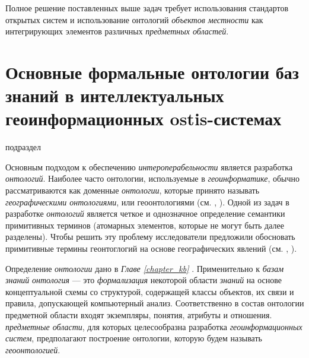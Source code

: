 Полное решение поставленных выше задач требует использования стандартов открытых систем и использование онтологий \textit{объектов местности} как интегрирующих элементов различных \textit{предметных областей}.

\newpage

\section{Основные формальные онтологии баз знаний в интеллектуальных геоинформационных ostis-системах}
\label{chapter_gis_sec_components}

\begin{SCn}	
\begin{scnrelfromlist}{подраздел}
\end{scnrelfromlist}
\end{SCn}

Основным подходом к обеспечению \textit{интероперабельности} является разработка \textit{онтологий}. Наиболее часто онтологии, используемые в \textit{геоинформатике}, обычно рассматриваются как доменные \textit{онтологии}, которые принято называть \textit{географическими онтологиями}, или геоонтологиями (см. , ). Одной из задач в разработке \textit{онтологий} является четкое и однозначное определение семантики примитивных терминов (атомарных элементов, которые не могут быть далее разделены). Чтобы решить эту проблему исследователи предложили обосновать примитивные термины геонтоглогий на основе географических явлений (см. , ).

Определение \textit{онтологии} дано в \textit{Главе \ref{chapter_kb} }. Применительно к \textit{базам знаний} \textit{онтология} --- это \textit{формализация} некоторой области \textit{знаний} на основе концептуальной схемы со структурой, содержащей классы объектов, их связи и правила, допускающей компьютерный анализ. Соответственно в состав онтологии предметной области входят экземпляры, понятия, атрибуты и отношения.
\textit{предметные области}, для которых целесообразна разработка \textit{геоинформационных систем}, предполагают построение онтологии, которую будем называть \textit{геоонтологией}.

